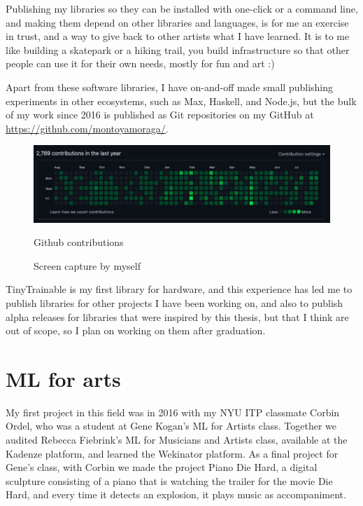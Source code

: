 Publishing my libraries so they can be installed with one-click or a command line, and making them depend on other libraries and languages, is for me an exercise in trust, and a way to give back to other artists what I have learned. It is to me like building a skatepark or a hiking trail, you build infrastructure so that other people can use it for their own needs, mostly for fun and art :)

Apart from these software libraries, I have on-and-off made small publishing experiments in other ecosystems, such as Max, Haskell, and Node.js, but the bulk of my work since 2016 is published as Git repositories on my GitHub at \url{https://github.com/montoyamoraga/}.

\begin{figure}[ht]
  \centering
  \includegraphics[width=0.80\linewidth,height=0.40\textheight,keepaspectratio]{images/github-contributions.jpg}
  \caption{Github contributions}
  \caption*{Screen capture by myself}
  \label{fig:github-contributions}
\end{figure}

TinyTrainable is my first library for hardware, and this experience has led me to publish libraries for other projects I have been working on, and also to publish alpha releases for libraries that were inspired by this thesis, but that I think are out of scope, so I plan on working on them after graduation.

\section{ML for arts}

My first project in this field was in 2016 with my \acrshort{NYU} \acrshort{ITP} classmate Corbin Ordel, who was a student at Gene Kogan's \acrshort{ML} for Artists class. Together we audited Rebecca Fiebrink's \acrshort{ML} for Musicians and Artists class, available at the Kadenze platform, and learned the Wekinator platform. As a final project for Gene's class, with Corbin we made the project Piano Die Hard, a digital sculpture consisting of a piano that is watching the trailer for the movie Die Hard, and every time it detects an explosion, it plays music as accompaniment.

